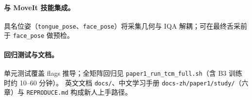 \paragraph{与 MoveIt 技能集成。}
具名位姿（\texttt{tongue\_pose}、\texttt{face\_pose}）将采集几何与 IQA 解耦；可在最终舌采前于 \texttt{face\_pose} 做预检。

\paragraph{回归测试与文档。}
单元测试覆盖 flags 推导；全矩阵回归见 \texttt{paper1\_run\_tcm\_full.sh}（含 B3 训练时约 10--60 分钟）。
英文文档 \texttt{docs/}、中文学习手册 \texttt{docs-zh/paper1/study/}（六章）与 \texttt{REPRODUCE.md} 构成新人上手路径。
